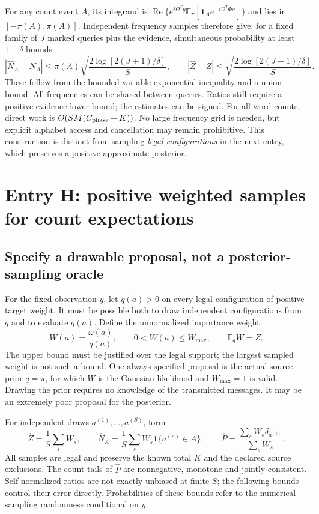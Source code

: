 \documentclass[10pt,a4paper]{article}
\newcommand{\E}{\mathbb E}
\newcommand{\ind}{\mathbf 1}
\begin{document}
For any count event $A$, its integrand is
$\operatorname{Re}\{e^{i\Omega^Ty}\E_\pi[\ind_Ae^{-i\Omega^T\Phi a}]\}$ and lies in
$[-\pi(A),\pi(A)]$. Independent frequency samples therefore give, for a fixed family of $J$ marked queries
plus the evidence, simultaneous probability at least $1-\delta$ bounds
\begin{equation}
 |\widehat N_A-N_A|\leq\pi(A)
       \sqrt{\frac{2\log[2(J+1)/\delta]}{S}},\qquad
 |\widehat Z-Z|\leq\sqrt{\frac{2\log[2(J+1)/\delta]}{S}}.
 \label{eq:random-frequency-bound}
\end{equation}
These follow from the bounded-variable exponential inequality and a union bound. All frequencies can be
shared between queries. Ratios still require a positive evidence lower bound; the estimates can be signed.
For all word counts, direct work is $O(SM(C_{\rm phase}+K))$. No large frequency grid is needed, but
explicit alphabet access and cancellation may remain prohibitive. This construction is distinct from
sampling \emph{legal configurations} in the next entry, which preserves a positive approximate posterior.

\clearpage
\section{Entry H: positive weighted samples for count expectations}
\label{sec:weighted-sampling}
\subsection{Specify a drawable proposal, not a posterior-sampling oracle}
For the fixed observation $y$, let $q(a)>0$ on every legal configuration of positive target weight.
It must be possible both to draw independent configurations from $q$ and to evaluate $q(a)$.
Define the unnormalized importance weight
\[
 W(a)=\frac{\omega(a)}{q(a)},\qquad
 0<W(a)\leq W_{\max},\qquad \E_qW=Z.
\]
The upper bound must be justified over the legal support; the largest sampled weight is not such a bound.
One always specified proposal is the actual source prior $q=\pi$, for which $W$ is the Gaussian likelihood
and $W_{\max}=1$ is valid. Drawing the prior requires no knowledge of the transmitted messages.
It may be an extremely poor proposal for the posterior.

For independent draws $a^{(1)},\ldots,a^{(S)}$, form
\[
 \widehat Z=\frac1S\sum_sW_s,\qquad
 \widehat N_A=\frac1S\sum_sW_s\ind\{a^{(s)}\in A\},\qquad
 \widehat P=\frac{\sum_sW_s\delta_{a^{(s)}}}{\sum_sW_s}.
\]
All samples are legal and preserve the known total $K$ and the declared source exclusions. The count tails
of $\widehat P$ are nonnegative, monotone and jointly consistent. Self-normalized ratios are not exactly
unbiased at finite $S$; the following bounds control their error directly. Probabilities of these bounds
refer to the numerical sampling randomness conditional on $y$.
\end{document}
